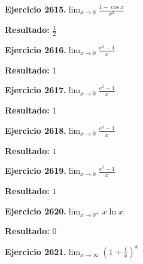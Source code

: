 \documentclass[10pt,a4paper]{article}
\begin{document}
\begin{ejbox}
\textbf{Ejercicio 2615.}\quad $\lim_{x\to 0} \frac{1-\cos x}{x^2}$
\end{ejbox}

\begin{solbox}
\textbf{Resultado:} \(\displaystyle \frac{1}{2}\)
\end{solbox}

\newpage
\begin{ejbox}
\textbf{Ejercicio 2616.}\quad $\lim_{x\to 0} \frac{e^x-1}{x}$
\end{ejbox}

\begin{solbox}
\textbf{Resultado:} \(\displaystyle 1\)
\end{solbox}

\begin{ejbox}
\textbf{Ejercicio 2617.}\quad $\lim_{x\to 0} \frac{e^x-1}{x}$
\end{ejbox}

\begin{solbox}
\textbf{Resultado:} \(\displaystyle 1\)
\end{solbox}

\begin{ejbox}
\textbf{Ejercicio 2618.}\quad $\lim_{x\to 0} \frac{e^x-1}{x}$
\end{ejbox}

\begin{solbox}
\textbf{Resultado:} \(\displaystyle 1\)
\end{solbox}

\newpage
\begin{ejbox}
\textbf{Ejercicio 2619.}\quad $\lim_{x\to 0} \frac{e^x-1}{x}$
\end{ejbox}

\begin{solbox}
\textbf{Resultado:} \(\displaystyle 1\)
\end{solbox}

\begin{ejbox}
\textbf{Ejercicio 2620.}\quad $\lim_{x\to 0^+} x\ln x$
\end{ejbox}

\begin{solbox}
\textbf{Resultado:} \(\displaystyle 0\)
\end{solbox}

\begin{ejbox}
\textbf{Ejercicio 2621.}\quad $\lim_{x\to \infty} \left(1+\frac{1}{x}\right)^x$
\end{ejbox}
\end{document}
